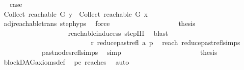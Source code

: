 \begin{isabellebody}
\ \isamarkupfalse%
\ {\isacharquery}{\kern0pt}case\isanewline
\ \ \ \ \ \ \ \ \ \ \ \ \ \ \isamarkupfalse%
\ {\isacharminus}{\kern0pt}\isanewline
\ \ \ \ \ \ \ \ \ \ \ \ \ \ \ \ \isamarkupfalse%
\ {\isachardoublequoteopen}Collect\ {\isacharparenleft}{\kern0pt}reachable\ G\ y{\isacharparenright}{\kern0pt}\ {\isasymsubseteq}\ Collect\ {\isacharparenleft}{\kern0pt}reachable\ G\ x{\isacharparenright}{\kern0pt}{\isachardoublequoteclose}\isanewline
\ \ \ \ \ \ \ \ \ \ \ \ \ \ \ \ \ \ \isamarkupfalse%
\ adj{\isacharunderscore}{\kern0pt}reachable{\isacharunderscore}{\kern0pt}trans\ step{\isachardot}{\kern0pt}hyps{\isacharparenleft}{\kern0pt}{}{\isacharparenright}{\kern0pt}\ \isamarkupfalse%
\ force\isanewline
\ \ \ \ \ \ \ \ \ \ \ \ \ \ \ \ \isamarkupfalse%
\ \isamarkupfalse%
\ {\isacharquery}{\kern0pt}thesis\isanewline
\ \ \ \ \ \ \ \ \ \ \ \ \ \ \ \ \ \ \isamarkupfalse%
\ reachable{\isacharunderscore}{\kern0pt}induce{\isacharunderscore}{\kern0pt}ss\ step{\isachardot}{\kern0pt}IH\ \isamarkupfalse%
\ blast\isanewline
\ \ \ \ \ \ \ \ \ \ \ \ \ \ \isamarkupfalse%
\ \isanewline
\ \ \ \ \ \ \ \ \ \ \ \ \isamarkupfalse%
\isanewline
\ \ \ \ \ \ \ \ \ \ \ \ \isamarkupfalse%
\ {\isachardoublequoteopen}r\ {\isasymrightarrow}\isactrlsup {\isacharasterisk}{\kern0pt}\isactrlbsub reduce{\isacharunderscore}{\kern0pt}past{\isacharunderscore}{\kern0pt}refl\ a\isactrlesub \ p{\isachardoublequoteclose}\ \isamarkupfalse%
\ reach\ reduce{\isacharunderscore}{\kern0pt}past{\isacharunderscore}{\kern0pt}refl{\isachardot}{\kern0pt}simps\ \isanewline
\ \ \ \ \ \ \ \ \ \ \ \ past{\isacharunderscore}{\kern0pt}nodes{\isacharunderscore}{\kern0pt}refl{\isachardot}{\kern0pt}simps\ \isamarkupfalse%
\ simp\isanewline
\ \ \ \ \ \ \ \ \ \ \isamarkupfalse%
\isanewline
\ \ \ \ \ \ \ \ \ \ \isamarkupfalse%
\ {\isachardoublequoteopen}{\isacharquery}{\kern0pt}thesis{\isachardoublequoteclose}\ \isamarkupfalse%
\ blockDAG{\isacharunderscore}{\kern0pt}axioms{\isacharunderscore}{\kern0pt}def\ \isamarkupfalse%
\ pe\ reaches\ \isamarkupfalse%
\ auto\isanewline
\ \ \ \ \ \ \ \ \isamarkupfalse%
\isanewline
\ \ \ \ \ \ \isamarkupfalse%
%
\endisatagproof
{\isafoldproof}%
%
\isadelimproof
%
\endisadelimproof
%
\isadelimdocument
%
\endisadelimdocument
%
\isatagdocument

\end{isabellebody}
